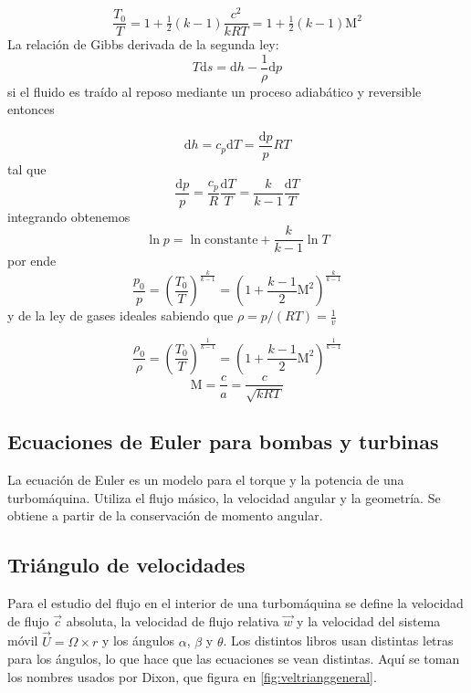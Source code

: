 \documentclass{article}
\newcommand{\cp}{c_p}
\newcommand{\Rconst}{R}
\newcommand{\gasconst}{k}
\newcommand{\speedsound}{a}
\newcommand{\Mach}{\textrm{M}}
\newcommand{\di}{\textrm{d}}
\newcommand{\cte}{\textrm{constante}}
\begin{document}
\begin{equation}\label{eq:tempstagnation}
 \frac{T_0}{T}=1+\tfrac{1}{2}(\gasconst-1)\frac{c^2}{\gasconst\Rconst T}=1+\tfrac{1}{2}(\gasconst-1)\Mach^2
\end{equation}
La relación de Gibbs derivada de la segunda ley:
\[T\di s = \di h - \frac{1}{\rho}\di p
\]
si el fluido es traído al reposo mediante un proceso adiabático y reversible entonces

\[\di h = \cp \di T =\frac{\di p}{p}\Rconst T
\]
tal que
\[
\frac{\di p}{p} = \frac{\cp}{\Rconst}\frac{\di T}{T} = \frac{\gasconst}{\gasconst-1}\frac{\di T}{T}
\]
integrando obtenemos
\[
\ln p = \ln \cte + \frac{\gasconst}{\gasconst-1}\ln T
\]
por ende
\begin{equation}
    \frac{p_0}{p}=\left(\frac{T_0}{T} \right)^{\frac{\gasconst}{\gasconst-1}} =\left(1+ \frac{\gasconst-1}{2}\Mach^2 \right)^{\frac{\gasconst}{\gasconst-1}}
\end{equation}
y de la ley de gases ideales sabiendo que \(\rho = p/(RT)=\frac{1}{v} \)


\begin{equation}
    \frac{\rho_0}{\rho}=\left(\frac{T_0}{T} \right)^{\frac{1}{\gasconst-1}} =\left(1+ \frac{\gasconst-1}{2}\Mach^2 \right)^{\frac{1}{\gasconst-1}}
\end{equation}
\[
\Mach=\frac{c}{\speedsound} = \frac{c}{\sqrt{\gasconst \Rconst T}}
\]
\subsection{Ecuaciones de Euler para bombas y turbinas}

La ecuación de Euler es un modelo para el torque y la potencia de una turbomáquina. Utiliza el flujo másico, la velocidad angular y la geometría. Se obtiene a partir de la conservación de momento angular. 

\subsection*{Triángulo de velocidades} Para el estudio del flujo en el interior de una turbomáquina se define la velocidad de flujo $\Vec{c}$ absoluta, la velocidad de flujo relativa $\Vec{w}$ y la velocidad del sistema móvil $\Vec{U}=\Omega \times r$ y los ángulos $\alpha$, $\beta$ y $\theta$. Los distintos libros usan distintas letras para los ángulos, lo que hace que las ecuaciones se vean distintas. Aquí se toman los nombres usados por Dixon, que figura en \ref{fig:veltrianggeneral}. 
\end{document}
